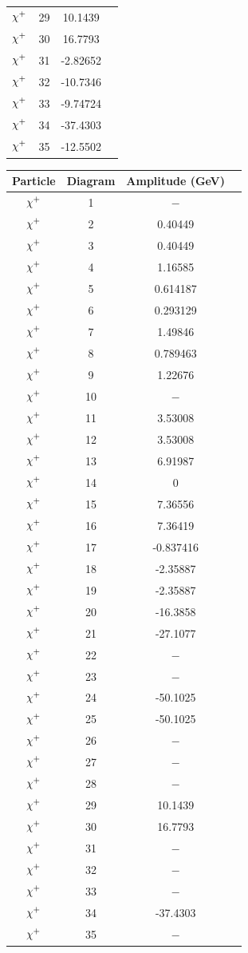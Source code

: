 \documentclass[11pt]{article}
\newcommand{\mychibig}{\raisebox{0pt}[1ex][1ex]{$\chi$}}
\begin{document}
\begin{table}[h!]
\begin{tabular}{c c c c}
$\mychibig^+$ & 29 & 10.1439 \\ 
$\mychibig^+$ & 30 & 16.7793 \\ 
$\mychibig^+$ & 31 & -2.82652 \\ 
$\mychibig^+$ & 32 & -10.7346 \\ 
$\mychibig^+$ & 33 & -9.74724 \\ 
$\mychibig^+$ & 34 & -37.4303 \\ 
$\mychibig^+$ & 35 & -12.5502 \\ 
\hline\end{tabular}
\begin{tabular}{c c c c}
Particle & Diagram & Amplitude (GeV) \\
\hline
$\mychibig^+$ & 1 & $-$ \\
$\mychibig^+$ & 2 & 0.40449 \\ 
$\mychibig^+$ & 3 & 0.40449 \\ 
$\mychibig^+$ & 4 & 1.16585 \\ 
$\mychibig^+$ & 5 & 0.614187 \\ 
$\mychibig^+$ & 6 & 0.293129 \\ 
$\mychibig^+$ & 7 & 1.49846 \\ 
$\mychibig^+$ & 8 & 0.789463 \\ 
$\mychibig^+$ & 9 & 1.22676 \\ 
$\mychibig^+$ & 10 & $-$ \\ 
$\mychibig^+$ & 11 & 3.53008 \\ 
$\mychibig^+$ & 12 & 3.53008 \\ 
$\mychibig^+$ & 13 & 6.91987 \\ 
$\mychibig^+$ & 14 & 0 \\ 
$\mychibig^+$ & 15 & 7.36556 \\ 
$\mychibig^+$ & 16 & 7.36419 \\ 
$\mychibig^+$ & 17 & -0.837416 \\ 
$\mychibig^+$ & 18 & -2.35887 \\ 
$\mychibig^+$ & 19 & -2.35887 \\ 
$\mychibig^+$ & 20 & -16.3858 \\ 
$\mychibig^+$ & 21 & -27.1077 \\ 
$\mychibig^+$ & 22 & $-$ \\ 
$\mychibig^+$ & 23 & $-$ \\ 
$\mychibig^+$ & 24 & -50.1025 \\ 
$\mychibig^+$ & 25 & -50.1025 \\ 
$\mychibig^+$ & 26 & $-$ \\ 
$\mychibig^+$ & 27 & $-$ \\ 
$\mychibig^+$ & 28 & $-$ \\ 
$\mychibig^+$ & 29 & 10.1439 \\ 
$\mychibig^+$ & 30 & 16.7793 \\ 
$\mychibig^+$ & 31 & $-$ \\ 
$\mychibig^+$ & 32 & $-$ \\ 
$\mychibig^+$ & 33 & $-$ \\ 
$\mychibig^+$ & 34 & -37.4303 \\ 
$\mychibig^+$ & 35 & $-$ \\ 


\end{tabular}
\end{table}
\end{document}
